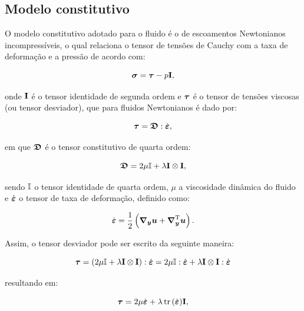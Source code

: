 \subsection{Modelo constitutivo} \label{MC}

O modelo constitutivo adotado para o fluido é o de escoamentos Newtonianos incompressíveis, o qual relaciona o tensor de tensões de Cauchy com a taxa de deformação e a pressão de acordo com:

\begin{equation}
    \boldsymbol{\sigma}=\boldsymbol{\tau}-p\mathbf{I}\text{,}\label{eq:const1}
\end{equation}

\noindent onde $\mathbf{I}$ é o tensor identidade de segunda ordem e $\boldsymbol{\tau}$ é o tensor de tensões viscosas (ou tensor desviador), que para fluidos Newtonianos é dado por:

\begin{equation}
    \boldsymbol{\tau}=\boldsymbol{\mathfrak{D}}:\dot{\boldsymbol{\varepsilon}}\text{,}
\end{equation}

\noindent em que $\boldsymbol{\mathfrak{D}}$ é o tensor constitutivo de quarta ordem:

\begin{equation}
    \boldsymbol{\mathfrak{D}}=2\mu\boldsymbol{\mathbb{I}}+\lambda\mathbf{I}\otimes\mathbf{I}\text{,}
\end{equation}

\noindent sendo $\boldsymbol{\mathbb{I}}$ o tensor identidade de quarta ordem, $\mu$ a viscosidade dinâmica do fluido e $\dot{\boldsymbol{\varepsilon}}$ o tensor de taxa de deformação, definido como:

\begin{equation}
    \dot{\boldsymbol{\varepsilon}}=\frac{1}{2}\left({\boldsymbol{\nabla_y}\boldsymbol{u}+\boldsymbol{\nabla}^{\mathrm{T}}_{\boldsymbol{y}}\boldsymbol{u}}\right)\text{.}\label{eq:deftax1}
\end{equation}

Assim, o tensor desviador pode ser escrito da seguinte maneira:

\[
    \boldsymbol{\tau}=(2\mu\boldsymbol{\mathbb{I}}+\lambda\mathbf{I}\otimes\mathbf{I}):\dot{\boldsymbol{\varepsilon}}=2\mu\boldsymbol{\mathbb{I}}:\dot{\boldsymbol{\varepsilon}}+\lambda\mathbf{I}\otimes\mathbf{I}:\dot{\boldsymbol{\varepsilon}}
\]

\noindent resultando em:

\begin{equation}
    \boldsymbol{\tau}=2\mu\dot{\boldsymbol{\varepsilon}}+\lambda\mathop{\mathrm{tr}}\nolimits{(\dot{\boldsymbol{\varepsilon}})}\mathbf{I}\text{,}
\end{equation}

